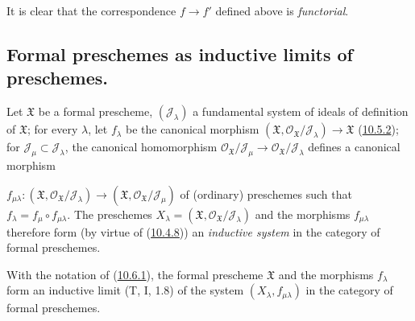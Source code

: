 It is clear that the correspondence $f\to f'$ defined above is
\emph{functorial}.


\subsection{Formal preschemes as inductive limits of preschemes.}
\label{subsection:I.10.6}

\begin{env}[10.6.1]
\label{I.10.6.1}
Let $\mathfrak{X}$ be a formal prescheme,
$(\mathscr{J}_\lambda)$ a fundamental system of ideals of definition of
$\mathfrak{X}$; for every $\lambda$, let $f_\lambda$ be the canonical
morphism
$(\mathfrak{X},\mathscr{O}_{\mathfrak{X}}/\mathscr{J}_\lambda)
\to\mathfrak{X}$ (\hyperref[I.10.5.2]{10.5.2}); for
$\mathscr{J}_\mu\subset\mathscr{J}_\lambda$, the canonical homomorphism
$\mathscr{O}_{\mathfrak{X}}/\mathscr{J}_\mu\to
\mathscr{O}_{\mathfrak{X}}/\mathscr{J}_\lambda$ defines a canonical
morphism


$f_{\mu\lambda}:(\mathfrak{X},
\mathscr{O}_{\mathfrak{X}}/\mathscr{J}_\lambda)\to
(\mathfrak{X},\mathscr{O}_{\mathfrak{X}}/\mathscr{J}_\mu)$ of
(ordinary) preschemes such that $f_\lambda=f_\mu\circ f_{\mu\lambda}$.
The preschemes
$X_\lambda=(\mathfrak{X},
\mathscr{O}_{\mathfrak{X}}/\mathscr{J}_\lambda)$ and the morphisms
$f_{\mu\lambda}$ therefore form (by virtue of
(\hyperref[I.10.4.8]{10.4.8})) an \emph{inductive system} in the
category of formal preschemes.
\end{env}

\begin{proposition}[10.6.2]
\label{I.10.6.2}
With the notation of \textup{(\hyperref[I.10.6.1]{10.6.1})}, the formal
prescheme $\mathfrak{X}$ and the morphisms $f_\lambda$ form an
inductive limit (T, I, 1.8) of the system $(X_\lambda,f_{\mu\lambda})$
in the category of formal preschemes.
\end{proposition}

